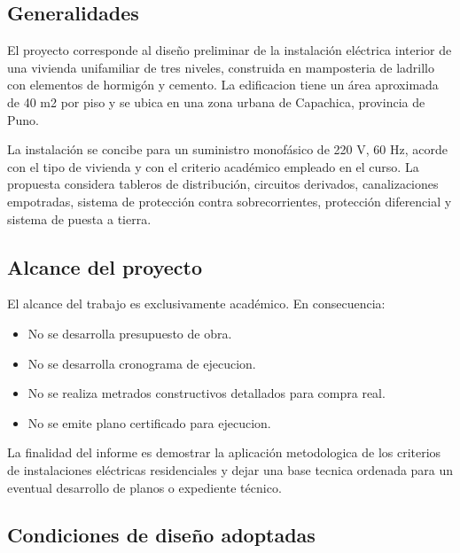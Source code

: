 \subsection{Generalidades}

El proyecto corresponde al diseño preliminar de la instalación eléctrica interior de una vivienda unifamiliar de tres niveles, construida en mamposteria de ladrillo con elementos de hormigón y cemento. La edificacion tiene un área aproximada de 40 m2 por piso y se ubica en una zona urbana de Capachica, provincia de Puno.

La instalación se concibe para un suministro monofásico de 220 V, 60 Hz, acorde con el tipo de vivienda y con el criterio académico empleado en el curso. La propuesta considera tableros de distribución, circuitos derivados, canalizaciones empotradas, sistema de protección contra sobrecorrientes, protección diferencial y sistema de puesta a tierra.

\subsection{Alcance del proyecto}

El alcance del trabajo es exclusivamente académico. En consecuencia:

\begin{itemize}
  \item No se desarrolla presupuesto de obra.
  \item No se desarrolla cronograma de ejecucion.
  \item No se realiza metrados constructivos detallados para compra real.
  \item No se emite plano certificado para ejecucion.
\end{itemize}

La finalidad del informe es demostrar la aplicación metodologica de los criterios de instalaciones eléctricas residenciales y dejar una base tecnica ordenada para un eventual desarrollo de planos o expediente técnico.

\subsection{Condiciones de diseño adoptadas}

